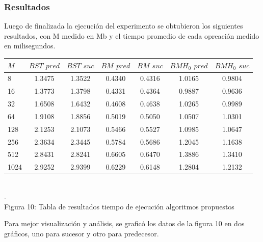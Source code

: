 \documentclass[11pt]{article}
\begin{document}
\subsubsection{Resultados}
Luego de finalizada la ejecución del experimento se obtubieron los siguientes resultados, con M medido en Mb y el tiempo promedio de cada opreación medido en milisegundos.
\begin{center}\begin{tabular}{|l|c|c|c|c|c|c|}
\hline
	$M$ & $BST$ $pred$ & $BST$ $suc$ & $BM$ $pred$ & $BM$ $suc$ & $BMH_{0}$ $pred$ & $BMH_{0}$ $suc$ \\
\hline
8	&   1.3475	&   1.3522	&   0.4340 &	   0.4316 &	   1.0165 &	   0.9804 \\
\hline
16	&   1.3773	&   1.3798	&   0.4331 &	   0.4364 &	   0.9887 &	   0.9636 \\
\hline
32	&   1.6508	&   1.6432	&   0.4608 &	   0.4638 &	   1.0265 &	   0.9989 \\
\hline
64	&   1.9108	&   1.8856	&   0.5019 &	   0.5050 &	   1.0507 &	   1.0301 \\
\hline
128	 &  2.1253	&   2.1073	&   0.5466 &	   0.5527 &	   1.0985 &	   1.0647 \\
\hline
256	 &  2.3634	&   2.3445	&   0.5784 &	   0.5686 &	   1.2045 &	   1.1638 \\
\hline
512	 &  2.8431	&   2.8241	&   0.6605 &	   0.6470 &	   1.3886 &	   1.3410 \\
\hline
1024 &	   2.9252	&   2.9399	&   0.6229 &	   0.6148 &	   1.2804 &	   1.2132 \\ 
\hline
\end{tabular}
\\\scriptsize{\color{white}.\color{black}\\Figura 10: Tabla de resultados tiempo de ejecución algoritmos propuestos}
\end{center}
Para mejor visualización y análisis, se graficó los datos de la figura 10 en dos gráficos, uno para sucesor y otro para predecesor.
\end{document}
